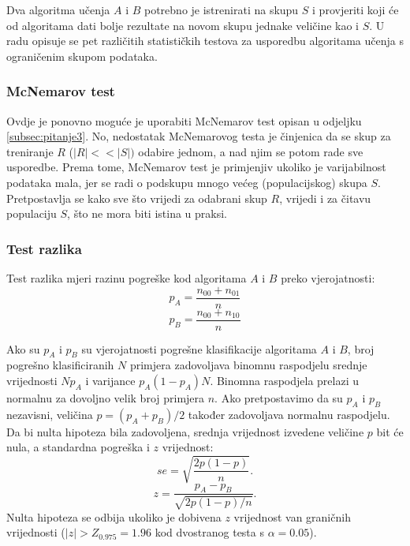 Dva algoritma učenja $A$ i $B$ potrebno je istrenirati na skupu $S$ i provjeriti koji će od algoritama dati bolje rezultate na novom skupu jednake veličine kao i $S$. U radu \citep{dietterich1998approximate} opisuje se pet različitih statističkih testova za usporedbu algoritama učenja s ograničenim skupom podataka. 

\subsubsection{McNemarov test}

Ovdje je ponovno moguće je uporabiti McNemarov test opisan u odjeljku \ref{subsec:pitanje3}. No, nedostatak McNemarovog testa je činjenica da se skup za treniranje $R$ ($|R| << |S|)$ odabire jednom, a nad njim se potom rade sve usporedbe. Prema tome, McNemarov test je primjenjiv ukoliko je varijabilnost podataka mala, jer se radi o podskupu mnogo većeg (populacijskog) skupa $S$. Pretpostavlja se kako sve što vrijedi za odabrani skup $R$, vrijedi i za čitavu populaciju $S$, što ne mora biti istina u praksi. 

\subsubsection{Test razlika}

Test razlika  \citep{snedecor1980statistical} mjeri razinu pogreške kod algoritama $A$ i $B$ preko vjerojatnosti:
\begin{equation}
p_A = \frac{n_{00} + n_{01}}{n}
\end{equation}
\begin{equation}
p_B = \frac{n_{00} + n_{10}}{n}
\end{equation}

Ako su $p_A$ i $p_B$ su vjerojatnosti pogrešne klasifikacije algoritama $A$ i $B$, broj pogrešno klasificiranih $N$ primjera zadovoljava binomnu raspodjelu srednje vrijednosti $Np_A$ i varijance $p_A(1-p_A)N$. Binomna raspodjela prelazi u normalnu za dovoljno velik broj primjera $n$. Ako pretpostavimo da su $p_A$ i $p_B$ nezavisni, veličina $p=(p_A+p_B)/2$ također zadovoljava normalnu raspodjelu. Da bi nulta hipoteza bila zadovoljena, srednja vrijednost izvedene veličine $p$ bit će nula, a standardna pogreška i $z$ vrijednost:
\begin{equation}
se = \sqrt{\frac{2p(1-p)}{n}}.
\end{equation}
\begin{equation}
z = \frac{p_A-p_B}{\sqrt{2p(1-p)/n}}.
\end{equation}
Nulta hipoteza se odbija ukoliko je dobivena $z$ vrijednost van graničnih vrijednosti ($|z| > Z_{0.975} = 1.96$ kod dvostranog testa s $\alpha=0.05$).

